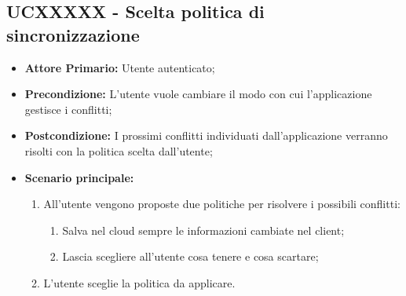 \subsection{UCXXXXX - Scelta politica di sincronizzazione}
\label{UCXXXXX}
\begin{itemize}
\item \textbf{Attore Primario:} Utente autenticato;
\item \textbf{Precondizione:} L'utente vuole cambiare il modo con cui l'applicazione gestisce i conflitti;
\item \textbf{Postcondizione:} I prossimi conflitti individuati dall'applicazione verranno risolti con la politica scelta dall'utente;
\item \textbf{Scenario principale:}
    \begin{enumerate}
    \item All'utente vengono proposte due politiche per risolvere i possibili conflitti:
        \begin{enumerate}
        \item Salva nel cloud sempre le informazioni cambiate nel client;
        \item Lascia scegliere all'utente cosa tenere e cosa scartare;
        \end{enumerate}
    \item L'utente sceglie la politica da applicare.
    \end{enumerate}
\end{itemize}